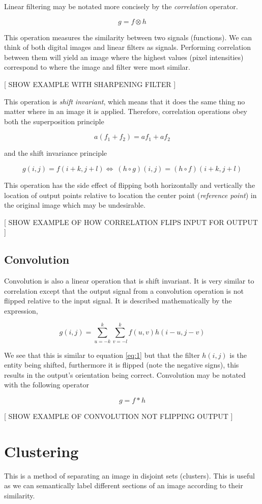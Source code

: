 Linear filtering may be notated more concisely by the \emph{correlation} operator.

\[g = f \otimes h\]

This operation measures the similarity between two signals (functions). We can think of both digital images and linear filters as signals. Performing correlation between them will yield an image where the highest values (pixel intensities) correspond to where the image and filter were most similar\cite{optimalKernel}.


[ SHOW EXAMPLE WITH SHARPENING FILTER ]

This operation is \emph{shift invariant}, which means that it does the same thing no matter where in an image it is applied. Therefore, correlation operations obey both the superposition principle

\[a(f_1 + f_2) = af_1 + af_2\]

and the shift invariance principle

\[g(i,j)=f(i+k,j+l) \Leftrightarrow\ (h\circ g)(i,j)=(h\circ f)(i+k,j+l)\]

This operation has the side effect of flipping both horizontally and vertically the location of output points relative to location the center point (\emph{reference point}) in the original image which may be undesirable.

[ SHOW EXAMPLE OF HOW CORRELATION FLIPS INPUT FOR OUTPUT ]

\subsection{Convolution}

Convolution is also a linear operation that is shift invariant. It is very similar to correlation except that the output signal from a convolution operation is not flipped relative to the input signal. It is described mathematically by the expression,

\[ g(i,j) = \sum_{u=-k}^{k}\sum_{v = -l}^{k}f(u,v)h(i-u,j-v)\]

We see that this is similar to equation \ref{eq:1} but that the filter $h(i,j)$ is the entity being shifted, furthermore it is flipped (note the negative signs), this results in the output's orientation being correct. Convolution may be notated with the following operator

\[g = f \ast h\]

[ SHOW EXAMPLE OF CONVOLUTION NOT FLIPPING OUTPUT ]


\section{Clustering}
This is a method of separating an image in disjoint sets (clusters). This is useful as we can semantically label different sections of an image according to their similarity.

